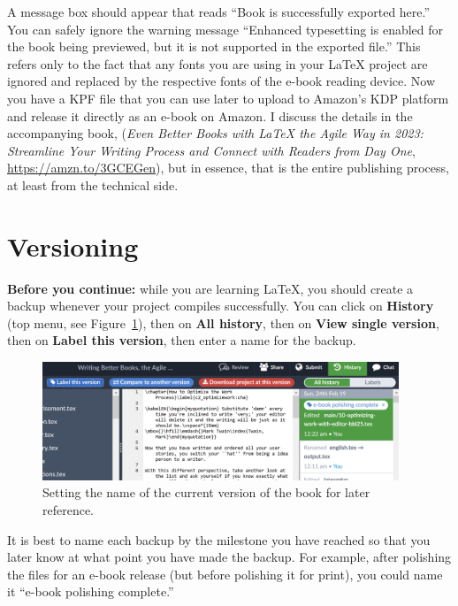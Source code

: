 A message box should appear that reads ``Book is successfully exported here.'' You can safely ignore the warning message ``Enhanced typesetting is enabled for the book being previewed, but it is not supported in the exported file.'' This refers only to the fact that any fonts you are using in your LaTeX project are ignored and replaced by the respective fonts of the e-book reading device. Now you have a KPF file that you can use later to upload to Amazon's KDP platform and release it directly as an e-book on Amazon. I discuss the details in the accompanying book, (\textit{Even Better Books with LaTeX the Agile Way in 2023: Streamline Your Writing Process and Connect with Readers from Day One}, \url{https://amzn.to/3GCEGen}), but in essence, that is the entire publishing process, at least from the technical side.



\section{Versioning}
\label{versioning:sec} 

\textbf{Before you continue:} while you are learning LaTeX, you should create a backup whenever your project compiles successfully. You can click on \textbf{History} (top menu, see Figure~\ref{versions:fig}), then on \textbf{All history}, then on \textbf{View single version}, then on \textbf{Label this version}, then enter a name for the backup.

\begin{figure}[H]\centering
\includegraphics[width=0.95\textwidth]{images/versions.png}
\caption{Setting the name of the current version of the book for later reference.}
\label{versions:fig}
\end{figure}

It is best to name each backup by the milestone you have reached so that you later know at what point you have made the backup. For example, after polishing the files for an e-book release (but before polishing it for print), you could name it ``e-book polishing complete.''

